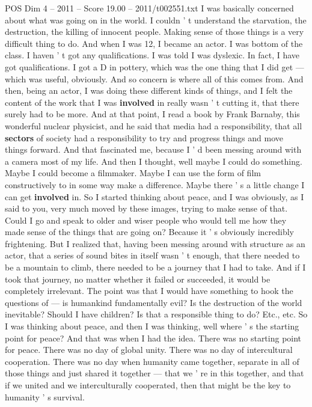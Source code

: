\begin{textsample}{POS Dim 4 – 2011 – Score 19.00 – 2011/t002551.txt}  \label{ex:f4_pos_074}
I was basically concerned about what was going on in the world.
I couldn ' t understand the starvation, the destruction, the killing of innocent people.
Making sense of those things is a very difficult thing to do.
And when I was 12, I became an actor.
I was bottom of the class.
I haven ' t got any qualifications.
I was told I was dyslexic.
In fact, I have got qualifications.
I got a D in pottery, which was the one thing that I did get — which was useful, obviously.
And so concern is where all of this comes from.
And then, being an actor, I was doing these different kinds of things, and I felt the content of the work that I was \textbf{involved} in really wasn ' t cutting it, that there surely had to be more.
And at that point, I read a book by Frank Barnaby, this wonderful nuclear physicist, and he said that media had a responsibility, that all \textbf{sectors} of society had a responsibility to try and progress things and move things forward.
And that fascinated me, because I ' d been messing around with a camera most of my life.
And then I thought, well maybe I could do something.
Maybe I could become a filmmaker.
Maybe I can use the form of film constructively to in some way make a difference.
Maybe there ' s a little change I can get \textbf{involved} in.
So I started thinking about peace, and I was obviously, as I said to you, very much moved by these images, trying to make sense of that.
Could I go and speak to older and wiser people who would tell me how they made sense of the things that are going on?
Because it ' s obviously incredibly frightening.
But I realized that, having been messing around with structure as an actor, that a series of sound bites in itself wasn ' t enough, that there needed to be a mountain to climb, there needed to be a journey that I had to take.
And if I took that journey, no matter whether it failed or succeeded, it would be completely irrelevant.
The point was that I would have something to hook the questions of — is humankind fundamentally evil?
Is the destruction of the world inevitable?
Should I have children?
Is that a responsible thing to do?
Etc., etc.
So I was thinking about peace, and then I was thinking, well where ' s the starting point for peace?
And that was when I had the idea.
There was no starting point for peace.
There was no day of global unity.
There was no day of intercultural cooperation.
There was no day when humanity came together, separate in all of those things and just shared it together — that we ' re in this together, and that if we united and we interculturally cooperated, then that might be the key to humanity ' s survival.

\end{textsample}

